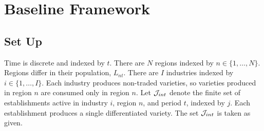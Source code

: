 

\maketitle



\section{Baseline Framework}\label{sec:baseline}

\subsection{Set Up}\label{sec:setup}

Time is discrete and indexed by $t$.
There are $N$ regions indexed by $n \in \{1, \dots, N\}$.
Regions differ in their population, $L_{nt}$.
There are $I$ industries indexed by $i \in \{1, \dots, I\}$.
Each industry produces non-traded varieties, so varieties produced in region $n$ are consumed only in region $n$.
Let ${\cal J}_{int}$ denote the finite set of establishments active in industry $i$, region $n$, and period $t$, indexed by $j$.
Each establishment produces a single differentiated variety.
The set ${\cal J}_{int}$ is taken as given.

